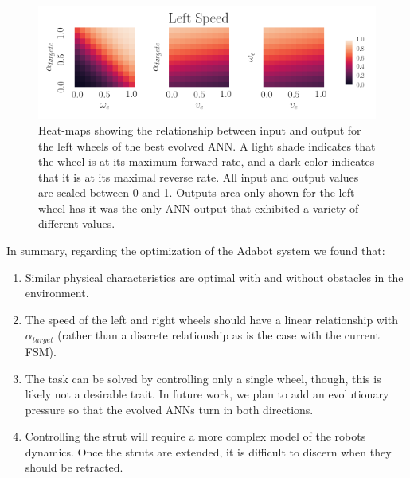 \begin{figure}[!ht]
    \centering


    \includegraphics[width=\columnwidth]{figures/4-results/ann_map.png}


    \caption{Heat-maps showing the relationship between input and output for the left wheels of the best evolved ANN. A light shade indicates that the wheel is at its maximum forward rate, and a dark color indicates that it is at its maximal reverse rate. All input and output values are scaled between 0 and 1. Outputs area only shown for the left wheel has it was the only ANN output that exhibited a variety of different values.}
    \label{fig:ANN-40-2-best-ann-map}


\end{figure}


In summary, regarding the optimization of the Adabot system we found that:

\begin{enumerate}

\item Similar physical characteristics are optimal with and without obstacles in the environment.

\item The speed of the left and right wheels should have a linear relationship with $\alpha_{\mathit{target}}$ (rather than a discrete relationship as is the case with the current FSM).

\item The task can be solved by controlling only a single wheel, though, this is likely not a desirable trait. In future work, we plan to add an evolutionary pressure so that the evolved ANNs turn in both directions.

\item Controlling the strut will require a more complex model of the robots dynamics. Once the struts are extended, it is difficult to discern when they should be retracted.

\end{enumerate}

